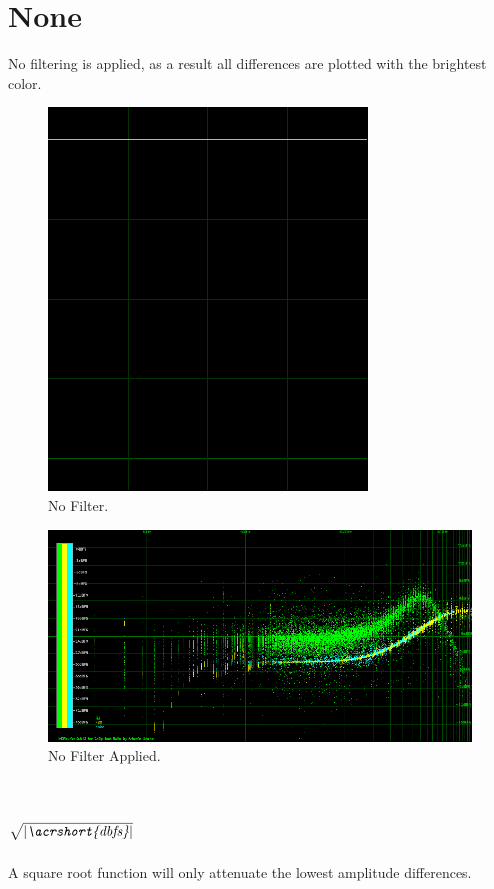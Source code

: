 \documentclass[10pt,a4paper]{report}
\newcommand{\ac}[1]{\textit{\mbox{\acrshort{#1}}}}
\newcommand{\rootdb}{$\sqrt{|\ac{dbfs}|}$}
\begin{document}
\begin{appendices}
\section{None} 

No filtering is applied, as a result all differences are plotted with the brightest color. 

\begin{figure}[H]
	\centering
	\includegraphics[width=0.4\linewidth]{images/colorfilter/BetaFunctionPlot_0.png}
	\caption[No Filter]{No Filter.}
	\label{fig:betafunctionplot0}
\end{figure}

\begin{figure}[H]
	\centering
	\includegraphics[width=1\linewidth]{images/colorfilter/BetaFunctionPlot_0_Data.png}
	\caption[No Filter]{No Filter Applied.}
	\label{fig:betafunctionplot0data}
\end{figure}

\section{\rootdb{}} 

A square root function will only attenuate the lowest amplitude differences.


\end{appendices}
\end{document}
